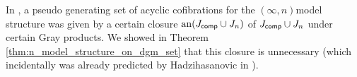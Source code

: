 \begin{comm}
    In \cite{chanavat2024model}, a pseudo generating set of acyclic cofibrations for the \( (\infty, n) \)\nbd model structure was given by a certain closure \( \mathrm{an}(J_{\mathsf{comp}} \cup J_{n}) \) of \( J_{\mathsf{comp}} \cup J_{n} \) under certain Gray products.
    We showed in Theorem \ref{thm:n_model_structure_on_dgm_set} that this closure is unnecessary (which incidentally was already predicted by Hadzihasanovic in \cite[Remark 6.9]{hadzihasanovic2020diagrammatic}).
\end{comm}

